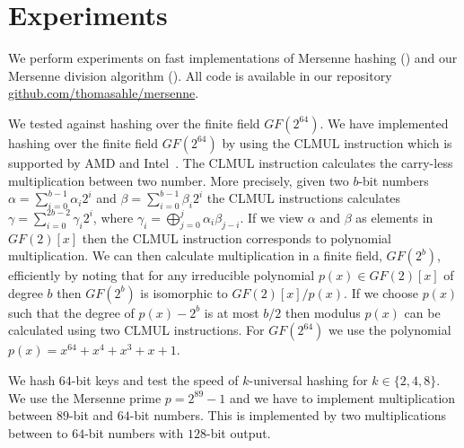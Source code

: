 \section{Experiments}\label{sec:experiments}
We perform experiments on fast implementations of Mersenne hashing () and our Mersenne division algorithm ().
All code is available in our repository\\\href{https://github.com/thomasahle/mersenne/}{github.com/thomasahle/mersenne}.

We tested  against hashing over the finite field $GF(2^{64})$.
We have implemented hashing over the finite field $GF(2^{64})$ by using the CLMUL instruction which is supported by AMD and Intel~\cite{GUERON2010549}.
The CLMUL instruction calculates the carry-less multiplication between two number.
More precisely, given two $b$-bit numbers $\alpha = \sum_{i = 0}^{b - 1} \alpha_i 2^i$ and $\beta = \sum_{i = 0}^{b - 1} \beta_i 2^i$
the CLMUL instructions calculates $\gamma = \sum_{i = 0}^{2b - 2} \gamma_i 2^i$, where $\gamma_i = \bigoplus_{j = 0}^{j} \alpha_i \beta_{j - i}$.
If we view $\alpha$ and $\beta$ as elements in $GF(2)[x]$ then the CLMUL instruction corresponds to polynomial multiplication.
We can then calculate multiplication in a finite field, $GF(2^b)$, efficiently by noting that for any irreducible polynomial $p(x) \in GF(2)[x]$
of degree $b$ then $GF(2^b)$ is isomorphic to $GF(2)[x] / p(x)$. If we choose $p(x)$ such that the degree of $p(x) - 2^{b}$ is at
most $b/2$ then modulus $p(x)$ can be calculated using two CLMUL instructions.
For $GF(2^{64})$ we use the polynomial $p(x) = x^{64} + x^4 + x^3 + x + 1$.

We hash $64$-bit keys and test the speed of $k$-universal hashing for $k \in \{2, 4, 8\}$.
We use the Mersenne prime $p = 2^89 - 1$ and we have to implement multiplication between
$89$-bit and $64$-bit numbers. This is implemented by two multiplications between to $64$-bit
numbers with $128$-bit output.

